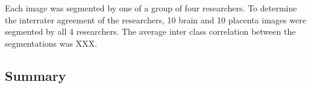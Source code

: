 Each image was segmented by one of a group of four researchers. To determine the interrater agreement of the researchers, 10 brain and 10 placenta images were segmented by all 4 researchers. The average inter class correlation between the segmentations was XXX. %








\subsection{Summary}


